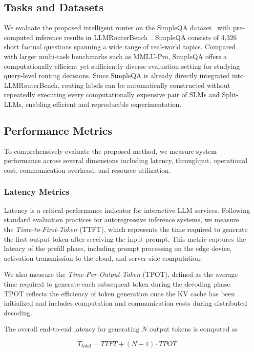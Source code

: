 \documentclass[lettersize,journal]{IEEEtran}
\begin{document}
\subsection{Tasks and Datasets}
We evaluate the proposed intelligent router on the SimpleQA dataset~\cite{sqa} with pre-computed inference results in LLMRouterBench~\cite{dataset}. SimpleQA consists of 4,326 short factual questions spanning a wide range of real-world topics. Compared with larger multi-task benchmarks such as MMLU-Pro, SimpleQA offers a computationally efficient yet sufficiently diverse evaluation setting for studying query-level routing decisions. Since SimpleQA is already directly integrated into LLMRouterBench, routing labels can be automatically constructed without repeatedly executing every computationally expensive pair of SLMs and Split-LLMs, enabling efficient and reproducible experimentation.

\subsection{Performance Metrics}
To comprehensively evaluate the proposed method, we measure system performance across several dimensions including latency, throughput, operational cost, communication overhead, and resource utilization.

\subsubsection{Latency Metrics}
Latency is a critical performance indicator for interactive LLM services. Following standard evaluation practices for autoregressive inference systems, we measure the \textit{Time-to-First-Token} (TTFT), which represents the time required to generate the first output token after receiving the input prompt. This metric captures the latency of the prefill phase, including prompt processing on the edge device, activation transmission to the cloud, and server-side computation.

We also measure the \textit{Time-Per-Output-Token} (TPOT), defined as the average time required to generate each subsequent token during the decoding phase. TPOT reflects the efficiency of token generation once the KV cache has been initialized and includes computation and communication costs during distributed decoding.

The overall end-to-end latency for generating $N$ output tokens is computed as

\begin{equation}
    T_{total} = TTFT + (N - 1) \cdot TPOT
\end{equation}
\end{document}
